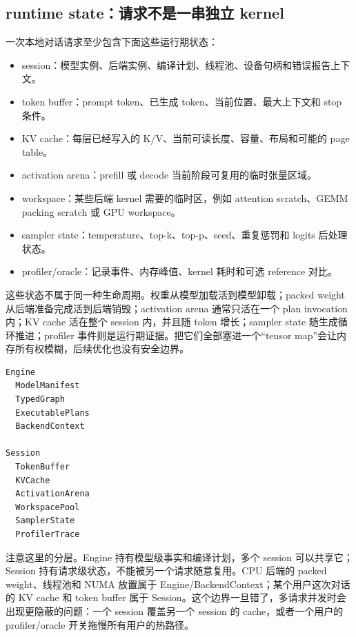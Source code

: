 \subsection{runtime state：请求不是一串独立 kernel}

一次本地对话请求至少包含下面这些运行期状态：

\begin{itemize}
  \item session：模型实例、后端实例、编译计划、线程池、设备句柄和错误报告上下文。
  \item token buffer：prompt token、已生成 token、当前位置、最大上下文和 stop 条件。
  \item KV cache：每层已经写入的 K/V、当前可读长度、容量、布局和可能的 page table。
  \item activation arena：prefill 或 decode 当前阶段可复用的临时张量区域。
  \item workspace：某些后端 kernel 需要的临时区，例如 attention scratch、GEMM packing scratch 或 GPU workspace。
  \item sampler state：temperature、top-k、top-p、seed、重复惩罚和 logits 后处理状态。
  \item profiler/oracle：记录事件、内存峰值、kernel 耗时和可选 reference 对比。
\end{itemize}

这些状态不属于同一种生命周期。权重从模型加载活到模型卸载；packed weight 从后端准备完成活到后端销毁；activation arena 通常只活在一个 plan invocation 内；KV cache 活在整个 session 内，并且随 token 增长；sampler state 随生成循环推进；profiler 事件则是运行期证据。把它们全部塞进一个“tensor map”会让内存所有权模糊，后续优化也没有安全边界。

\begin{lstlisting}[numbers=none,caption={推理 runtime 的核心对象关系}]
Engine
  ModelManifest
  TypedGraph
  ExecutablePlans
  BackendContext

Session
  TokenBuffer
  KVCache
  ActivationArena
  WorkspacePool
  SamplerState
  ProfilerTrace
\end{lstlisting}

注意这里的分层。Engine 持有模型级事实和编译计划，多个 session 可以共享它；Session 持有请求级状态，不能被另一个请求随意复用。CPU 后端的 packed weight、线程池和 NUMA 放置属于 Engine/BackendContext；某个用户这次对话的 KV cache 和 token buffer 属于 Session。这个边界一旦错了，多请求并发时会出现更隐蔽的问题：一个 session 覆盖另一个 session 的 cache，或者一个用户的 profiler/oracle 开关拖慢所有用户的热路径。

